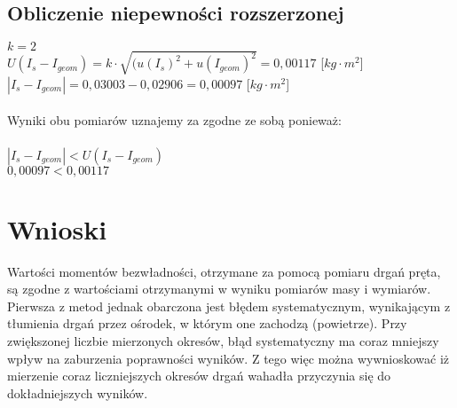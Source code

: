 \documentclass{article}
\begin{document}
\subsection{Obliczenie niepewności rozszerzonej}
$k = 2$\\
$U(I_{s} - I_{geom}) = k \cdot \sqrt{(u(I_{s})^2 + u(I_{geom})^2} = 0,00117$ [$kg \cdot m^2$]\\
$|I_{s} - I_{geom}| = 0,03003-0,02906=0,00097$ [$kg \cdot m^2$] \\\\

Wyniki obu pomiarów uznajemy za zgodne ze sobą ponieważ: \\\\
$|I_{s} - I_{geom}| < U(I_{s} - I_{geom})$ \\
$0,00097 < 0,00117$ \\
 
 \section{Wnioski}
 Wartości momentów bezwładności, otrzymane za pomocą pomiaru drgań pręta, są zgodne z wartościami otrzymanymi w wyniku pomiarów masy i wymiarów. Pierwsza z metod jednak obarczona jest błędem systematycznym, wynikającym z tłumienia drgań przez ośrodek, w którym one zachodzą (powietrze). Przy zwiększonej liczbie mierzonych okresów, błąd systematyczny ma coraz mniejszy wpływ na zaburzenia poprawności wyników. Z tego więc można wywnioskować iż mierzenie coraz liczniejszych okresów drgań wahadła przyczynia się do dokładniejszych wyników.	
	
\end{document}
